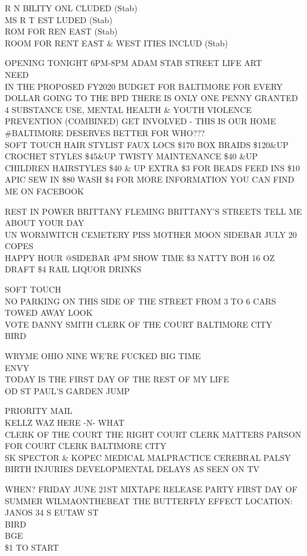 \documentclass[10pt,letterpaper]{article}
\begin{document}
R N BILITY ONL CLUDED (Stab)\\
MS R T EST LUDED (Stab)\\
ROM FOR REN EAST (Stab)\\
ROOM FOR RENT EAST \& WEST ITIES INCLUD (Stab)

OPENING TONIGHT 6PM{-}8PM ADAM STAB STREET LIFE ART\\
NEED\\
IN THE PROPOSED FY2020 BUDGET FOR BALTIMORE FOR EVERY DOLLAR GOING TO THE BPD THERE IS ONLY ONE PENNY GRANTED 4 SUBSTANCE USE, MENTAL HEALTH \& YOUTH VIOLENCE PREVENTION (COMBINED) GET INVOLVED {-} THIS IS OUR HOME \#BALTIMORE DESERVES BETTER FOR WHO???\\
SOFT TOUCH HAIR STYLIST FAUX LOCS \$170 BOX BRAIDS \$120\&UP CROCHET STYLES \$45\&UP TWISTY MAINTENANCE \$40 \&UP CHILDREN HAIRSTYLES \$40 \& UP EXTRA \$3 FOR BEADS FEED INS \$10 APIC SEW IN \$80 WASH \$4 FOR MORE INFORMATION YOU CAN FIND ME ON FACEBOOK

REST IN POWER BRITTANY FLEMING BRITTANY'S STREETS TELL ME ABOUT YOUR DAY\\
UN WORMWITCH CEMETERY PISS MOTHER MOON SIDEBAR JULY 20\\
COPES\\
HAPPY HOUR @SIDEBAR 4PM SHOW TIME \$3 NATTY BOH 16 OZ DRAFT \$4 RAIL LIQUOR DRINKS

SOFT TOUCH\\
NO PARKING ON THIS SIDE OF THE STREET FROM 3 TO 6 CARS TOWED AWAY LOOK\\
VOTE DANNY SMITH CLERK OF THE COURT BALTIMORE CITY\\
BIRD

WRYME OHIO NINE WE'RE FUCKED BIG TIME\\
ENVY\\
TODAY IS THE FIRST DAY OF THE REST OF MY LIFE\\
OD ST PAUL'S GARDEN JUMP

PRIORITY MAIL\\
KELLZ WAZ HERE {-}N{-} WHAT\\
CLERK OF THE COURT THE RIGHT COURT CLERK MATTERS PARSON FOR COURT CLERK BALTIMORE CITY\\
SK SPECTOR \& KOPEC MEDICAL MALPRACTICE CEREBRAL PALSY BIRTH INJURIES DEVELOPMENTAL DELAYS AS SEEN ON TV

WHEN?  FRIDAY JUNE 21ST MIXTAPE RELEASE PARTY FIRST DAY OF SUMMER WILMAONTHEBEAT THE BUTTERFLY EFFECT LOCATION: JANOS 34 S EUTAW ST\\
BIRD\\
BGE\\
\$1 TO START
\end{document}
